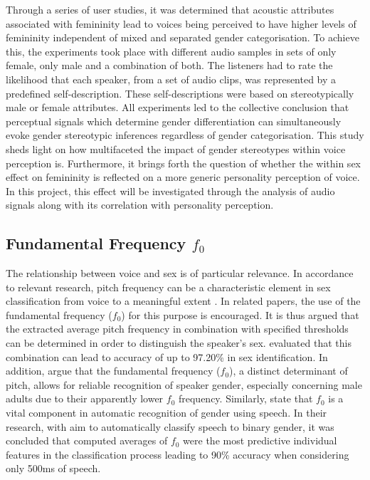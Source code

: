 \documentclass{l4proj}
\begin{document}
Through a series of user studies, it was determined that acoustic attributes associated with femininity lead to voices being perceived to have higher levels of femininity independent of mixed and separated gender categorisation. To achieve this, the experiments took place with different audio samples in sets of only female, only male and a combination of both. The listeners had to rate the likelihood that each speaker, from a set of audio clips, was represented by a predefined self-description. These self-descriptions were based on stereotypically male or female attributes.
All experiments led to the collective conclusion that perceptual signals which determine gender differentiation can simultaneously evoke gender stereotypic inferences regardless of gender categorisation.
This study sheds light on how multifaceted the impact of gender stereotypes within voice perception is. 
Furthermore, it brings forth the question of whether the within sex effect on femininity is reflected on a more generic personality perception of voice.
In this project, this effect will be investigated through the analysis of audio signals along with its correlation with personality perception.

\subsection{Fundamental Frequency $f_0$}
\label{sec:f_0}
The relationship between voice and sex is of particular relevance. In accordance to relevant research, pitch frequency can be a characteristic element in sex classification from voice to a meaningful extent \citep{Lindqvist2021,Dourlent2017,lips2020sex}. In related papers, the use of the fundamental frequency ($f_0$) for this purpose is encouraged. It is thus argued that the extracted average pitch frequency in combination with specified thresholds can be determined in order to distinguish the speaker’s sex. \citet{Phoophuangpairoj2016} evaluated that this combination can lead to accuracy of up to 97.20\% in sex identification.
In addition, \citet{Owren2007} argue that the fundamental frequency ($f_0$), a distinct determinant of pitch, allows for reliable recognition of speaker gender, especially concerning male adults due to their apparently lower $f_0$ frequency. 
Similarly, \citet{Levitan2016} state that $f_0$ is a vital component in automatic recognition of gender using speech. In their research, with aim to automatically classify speech to binary gender, it was concluded that computed averages of $f_0$ were the most predictive individual features in the classification process leading to 90\% accuracy when considering only 500ms of speech. 
\end{document}
